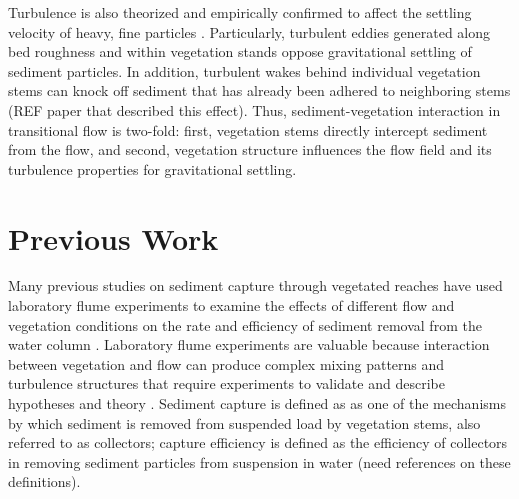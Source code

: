 \documentclass{scrreprt}
\begin{document}
Turbulence is also theorized and empirically confirmed to affect the settling velocity of heavy, fine particles \citep{Nielsen_1993, Jacobs_2016, Wang_2018}. Particularly, turbulent eddies generated along bed roughness and within vegetation stands oppose gravitational settling of sediment particles. In addition, turbulent wakes behind individual vegetation stems can knock off sediment that has already been adhered to neighboring stems (REF paper that described this effect). Thus, sediment-vegetation interaction in transitional flow is two-fold: first, vegetation stems directly intercept sediment from the flow, and second, vegetation structure influences the flow field and its turbulence properties for gravitational settling.

\section{Previous Work}

Many previous studies on sediment capture through vegetated reaches have used laboratory flume experiments to examine the effects of different flow and vegetation conditions on the rate and efficiency of sediment removal from the water column \citep{Fauria_2015, Palmer_2004, Purich_2007,  Zhang_reconfiguration_2020, Zhang_turbulence_2020}. Laboratory flume experiments are valuable because interaction between vegetation and flow can produce complex mixing patterns and turbulence structures that require experiments to validate and describe hypotheses and theory \citep{Nepf_2012, Nepf_2008}. Sediment capture is defined as as one of the mechanisms by which sediment is removed from suspended load by vegetation stems, also referred to as collectors; capture efficiency is defined as the efficiency of collectors in removing sediment particles from suspension in water (need references on these definitions).  
\end{document}
